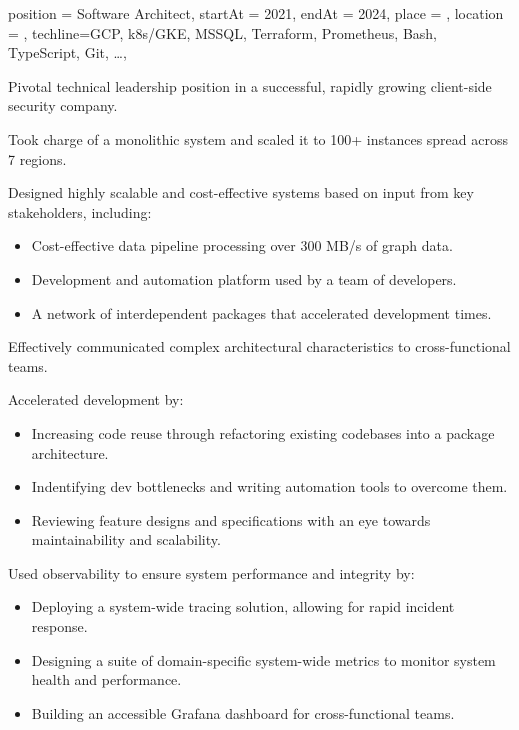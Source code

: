 
\begin{placex}{%
    position = {Software Architect},
    startAt = 2021,
    endAt = 2024,
    place = ,
    location = \ramatgan,
    techline={GCP, k8s/GKE, MSSQL, Terraform, Prometheus, Bash,
    TypeScript, Git, \dots},
  }%
\item Pivotal technical leadership position in a successful, rapidly
  growing client-side security company.
\item Took charge of a monolithic system and scaled it to 100+
  instances spread across 7 regions.

\item Designed highly scalable and cost-effective systems based on
  input from key stakeholders, including:
  \begin{itemize}
    \item Cost-effective data pipeline processing over 300 MB/s of graph data.
    \item Development and automation platform used by a team of developers.
    \item A network of interdependent packages that accelerated
      development times.
  \end{itemize}
\item Effectively communicated complex architectural
  characteristics to cross-functional teams.
\item Accelerated development by:
  \begin{itemize}
    \item Increasing code reuse through refactoring existing
      codebases into a package architecture.
    \item Indentifying dev bottlenecks and writing automation tools
      to overcome them.
    \item Reviewing feature designs and specifications with an eye
      towards maintainability and scalability.
  \end{itemize}
\item Used observability to ensure system performance and integrity by:
  \begin{itemize}
    \item Deploying a system-wide tracing solution, allowing for
      rapid incident response.
    \item Designing a suite of domain-specific system-wide metrics
      to monitor system health and performance.
    \item Building an accessible Grafana dashboard for cross-functional teams.
  \end{itemize}

\end{placex}
